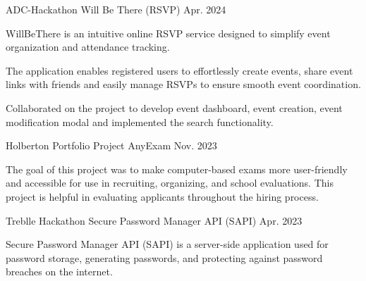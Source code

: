 \begin{cventries}
  \cventry
  {ADC-Hackathon} %
  {Will Be There (RSVP) } %
  {} %
  {Apr. 2024} %
  {
    \begin{cvitems} %
      \item {WillBeThere is an intuitive online RSVP service designed to
                  simplify event organization and attendance tracking.}
      \item {The application enables registered users to effortlessly create
                  events, share event links with friends and easily manage
                  RSVPs to ensure smooth
                  event coordination.}
      \item {Collaborated on the project to develop event dashboard, event
                  creation, event modification modal and implemented the search
                  functionality.}
    \end{cvitems}
  }
  \cventry
  {Holberton Portfolio Project} %
  {AnyExam } %
  {} %
  {Nov. 2023} %
  {
    \begin{cvitems} %
      \item {The goal of this project was to make computer-based exams more
                  user-friendly and accessible for use in recruiting,
                  organizing, and school
                  evaluations. This project is helpful in evaluating applicants
                  throughout the
                  hiring process.}
    \end{cvitems}
  }

  \cventry
  {Treblle Hackathon} %
  {Secure Password Manager API (SAPI) } %
  {} %
  {Apr. 2023} %
  {
    \begin{cvitems} %
      \item {Secure Password Manager API (SAPI) is a server-side application
                  used for password storage, generating passwords, and
                  protecting against
                  password breaches on the internet.}
    \end{cvitems}
  }

\end{cventries}

